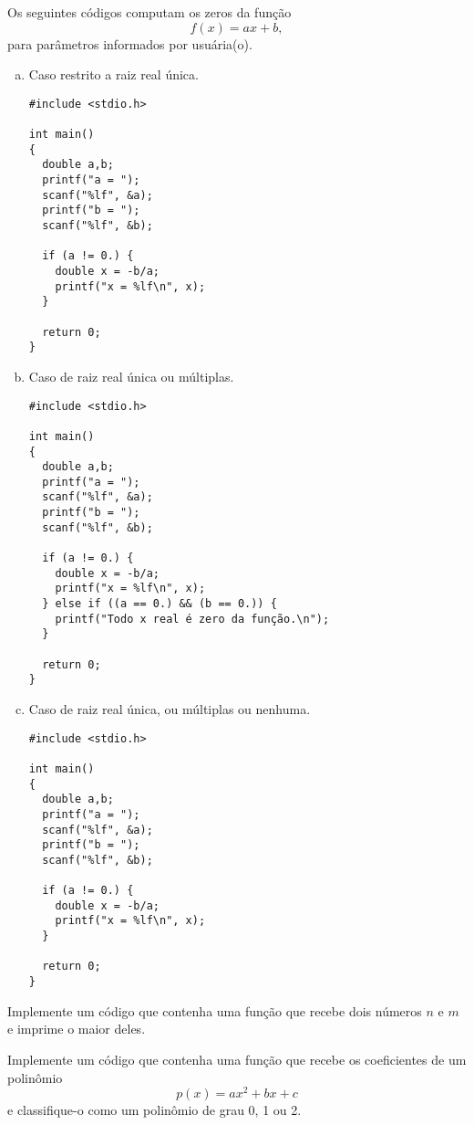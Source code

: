 \documentclass[12pt]{article}
\begin{document}
\begin{ex}
  Os seguintes códigos computam os zeros da função
  \begin{equation}
    f(x) = ax + b,
  \end{equation}
  para parâmetros informados por usuária(o).
  \begin{enumerate}[a)]
  \item Caso restrito a raiz real única.
\begin{lstlisting}
#include <stdio.h>

int main()
{
  double a,b;
  printf("a = ");
  scanf("%lf", &a);
  printf("b = ");
  scanf("%lf", &b);

  if (a != 0.) {
    double x = -b/a;
    printf("x = %lf\n", x);
  }

  return 0;
}
\end{lstlisting}
    
  \item Caso de raiz real única ou múltiplas.
\begin{lstlisting}
#include <stdio.h>

int main()
{
  double a,b;
  printf("a = ");
  scanf("%lf", &a);
  printf("b = ");
  scanf("%lf", &b);

  if (a != 0.) {
    double x = -b/a;
    printf("x = %lf\n", x);
  } else if ((a == 0.) && (b == 0.)) {
    printf("Todo x real é zero da função.\n");
  }

  return 0;
}
\end{lstlisting}

  \item Caso de raiz real única, ou múltiplas ou nenhuma.
\begin{lstlisting}
#include <stdio.h>

int main()
{
  double a,b;
  printf("a = ");
  scanf("%lf", &a);
  printf("b = ");
  scanf("%lf", &b);

  if (a != 0.) {
    double x = -b/a;
    printf("x = %lf\n", x);
  }

  return 0;
}
\end{lstlisting}
  \end{enumerate}
\end{ex}

\begin{exr}
  Implemente um código que contenha uma função que recebe dois números $n$ e $m$ e imprime o maior deles.
\end{exr}

\begin{exr}
  Implemente um código que contenha uma função que recebe os coeficientes de um polinômio
  \begin{equation}
    p(x) = ax^2 + bx + c
  \end{equation}
  e classifique-o como um polinômio de grau 0, 1 ou 2.
\end{exr}
\end{document}
